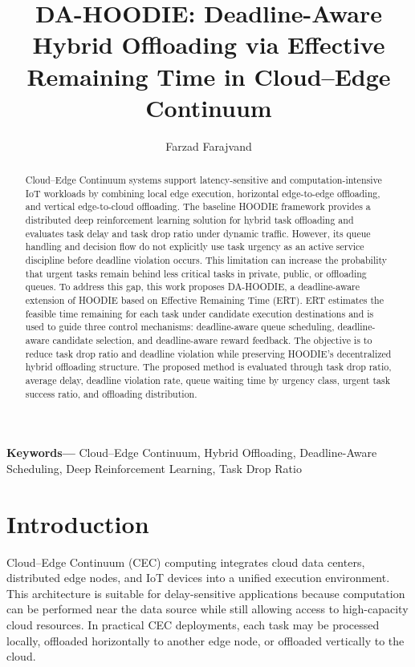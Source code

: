 \documentclass{article}
\begin{document}
\title{DA-HOODIE: Deadline-Aware Hybrid Offloading via Effective Remaining Time in Cloud--Edge Continuum}
\author{Farzad Farajvand}
\date{}
\maketitle

\begin{abstract}
Cloud--Edge Continuum systems support latency-sensitive and computation-intensive IoT workloads by combining local edge execution, horizontal edge-to-edge offloading, and vertical edge-to-cloud offloading. The baseline HOODIE framework provides a distributed deep reinforcement learning solution for hybrid task offloading and evaluates task delay and task drop ratio under dynamic traffic. However, its queue handling and decision flow do not explicitly use task urgency as an active service discipline before deadline violation occurs. This limitation can increase the probability that urgent tasks remain behind less critical tasks in private, public, or offloading queues. To address this gap, this work proposes DA-HOODIE, a deadline-aware extension of HOODIE based on Effective Remaining Time (ERT). ERT estimates the feasible time remaining for each task under candidate execution destinations and is used to guide three control mechanisms: deadline-aware queue scheduling, deadline-aware candidate selection, and deadline-aware reward feedback. The objective is to reduce task drop ratio and deadline violation while preserving HOODIE's decentralized hybrid offloading structure. The proposed method is evaluated through task drop ratio, average delay, deadline violation rate, queue waiting time by urgency class, urgent task success ratio, and offloading distribution.
\end{abstract}

\noindent\textbf{Keywords---} Cloud--Edge Continuum, Hybrid Offloading, Deadline-Aware Scheduling, Deep Reinforcement Learning, Task Drop Ratio

\section{Introduction}
\label{sec:introduction}

Cloud--Edge Continuum (CEC) computing integrates cloud data centers, distributed edge nodes, and IoT devices into a unified execution environment. This architecture is suitable for delay-sensitive applications because computation can be performed near the data source while still allowing access to high-capacity cloud resources. In practical CEC deployments, each task may be processed locally, offloaded horizontally to another edge node, or offloaded vertically to the cloud.
\end{document}

